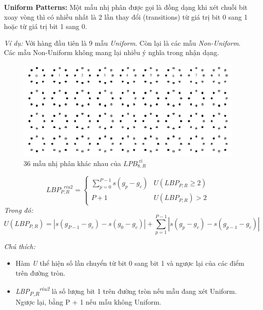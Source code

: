 \textbf{Uniform Patterns:} Một mẫu nhị phân được gọi là đồng dạng khi xét chuỗi bit xoay vòng thì có nhiều nhất là 2 lần thay đổi (transitions) từ giá trị bit 0 sang 1 hoặc từ giá trị bit 1 sang 0. 

\textit{Ví dụ: }Với hàng đầu tiên là 9 mẫu \textit{Uniform}. Còn lại là các mẫu \textit{Non-Uniform}. Các mẫu Non-Uniform không mang lại nhiều ý nghĩa trong nhận dạng.
\begin{figure}[H]
	\begin{center}
		\includegraphics[scale=0.4]{images/theo1/uniform_exam}
		\caption{36 mẫu nhị phân khác nhau của $LPB_{8,R}^{\text{  ri}}$}
	\end{center}
\end{figure}

\begin{equation}
	LBP_{P,R}^{\text{  }riu2}=\begin{cases}
		\sum_{p=0}^{P-1}{s(g_p-g_c)}  & U(LBP_{P,R}\geq 2)\\
		P + 1 & U(LBP_{P,R}) > 2
	\end{cases}
\end{equation}
\textit{Trong đó:}
$$
	U(LBP_{P,R})=\left\lvert s(g_{P-1} - g_c)-s(g_0-g_c)\right\rvert + \sum_{p=1}^{P-1}{\left\lvert s(g_p - g_c)-s(g_{p-1}-g_c)\right\rvert}
$$

\textit{Chú thích:} 
\begin{itemize}
	\item Hàm \textit{U} thể hiện số lần chuyển từ bit 0 sang bit 1 và ngược lại của các điểm trên đường tròn.
	\item \textit{LBP\textsubscript{P,R}\textsuperscript{riu2}} là số lượng bit 1 trên đường tròn nếu mẫu đang xét Uniform. Ngược lại, bằng P + 1 nếu mẫu không Uniform.
\end{itemize}
\pagebreak

